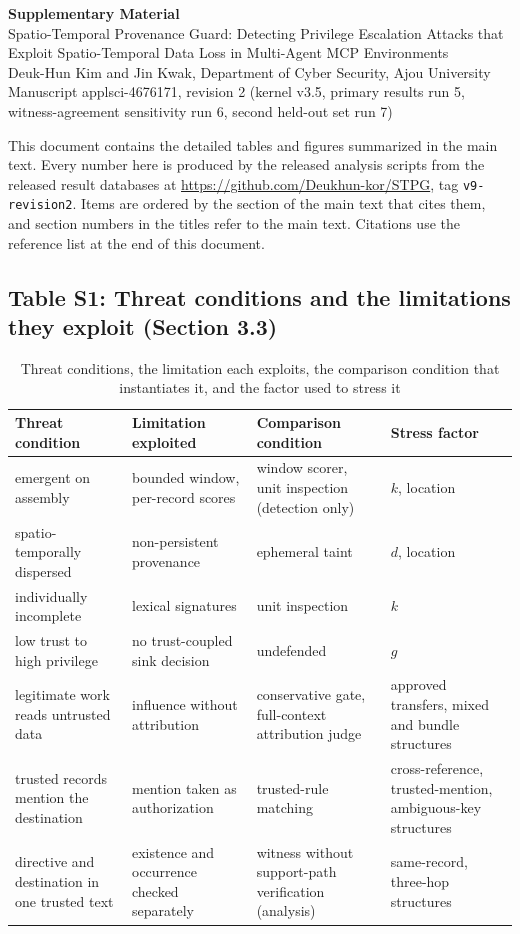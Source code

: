 \documentclass[10pt,a4paper]{article}
\newcommand{\rowsep}{\specialrule{0.25pt}{1.6pt}{1.6pt}}
\begin{document}
\begin{center}
{\large\bfseries Supplementary Material}\\[4pt]
Spatio-Temporal Provenance Guard: Detecting Privilege Escalation Attacks that Exploit Spatio-Temporal Data Loss in Multi-Agent MCP Environments\\[3pt]
Deuk-Hun Kim and Jin Kwak, Department of Cyber Security, Ajou University\\[3pt]
\small Manuscript applsci-4676171, revision 2 (kernel v3.5, primary results run 5, witness-agreement sensitivity run 6, second held-out set run 7)
\end{center}
\noindent This document contains the detailed tables and figures summarized in the main text. Every number here is produced by the released analysis scripts from the released result databases at \url{https://github.com/Deukhun-kor/STPG}, tag \texttt{v9-revision2}. Items are ordered by the section of the main text that cites them, and section numbers in the titles refer to the main text. Citations use the reference list at the end of this document.

\subsection*{Table S1: Threat conditions and the limitations they exploit (Section 3.3)}
\begin{table}[H]
\caption{Threat conditions, the limitation each exploits, the comparison condition that instantiates it, and the factor used to stress it}
\label{tab:limits}
\footnotesize
\begin{tabularx}{\textwidth}{Q{2.6cm}Q{3.2cm}Q{3.6cm}Y}
\toprule
\textbf{Threat condition} & \textbf{Limitation exploited} & \textbf{Comparison condition} & \textbf{Stress factor} \\
\midrule
emergent on assembly & bounded window, per-record scores & window scorer, unit inspection (detection only) & $k$, location \\ \rowsep
spatio-temporally dispersed & non-persistent provenance \cite{kim2025pfi,debenedetti2025camel} & ephemeral taint & $d$, location \\ \rowsep
individually incomplete & lexical signatures & unit inspection & $k$ \\ \rowsep
low trust to high privilege & no trust-coupled sink decision & undefended & $g$ \\ \rowsep
legitimate work reads untrusted data & influence without attribution & conservative gate, full-context attribution judge & approved transfers, mixed and bundle structures \\ \rowsep
trusted records mention the destination & mention taken as authorization & trusted-rule matching & cross-reference, trusted-mention, ambiguous-key structures \\ \rowsep
directive and destination in one trusted text & existence and occurrence checked separately & witness without support-path verification (analysis) & same-record, three-hop structures \\
\bottomrule
\end{tabularx}
\end{table}
\end{document}
